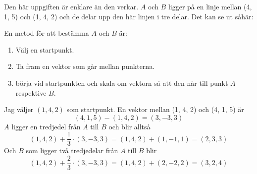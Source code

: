 \documentclass[../main.tex]{subfiles}
\begin{document}
\begin{solution}{4}
Den här uppgiften är enklare än den verkar. $A$ och $B$ ligger på en linje mellan (4, 1, 5) och (1, 4, 2) och de delar upp den här linjen i tre delar. Det kan se ut såhär:

\begin{center}
\end{center}

En metod för att bestämma $A$ och $B$ är:
\begin{enumerate}
    \item Välj en startpunkt.
    \item Ta fram en vektor som går mellan punkterna. 
    \item börja vid startpunkten och skala om vektorn så att den når till punkt $A$ respektive $B$.
\end{enumerate}

Jag väljer $(1, 4, 2)$ som startpunkt. En vektor mellan (1, 4, 2) och (4, 1, 5) är 
\[(4, 1, 5) - (1, 4, 2) = (3, -3, 3)\]
$A$ ligger en tredjedel från $A$ till $B$ och blir alltså
\[(1, 4, 2) + \frac{1}{3}\cdot(3, -3, 3) = (1, 4, 2) + (1, -1, 1) = (2, 3, 3)\]
Och $B$ som ligger två tredjedelar från $A$ till $B$ blir
\[(1, 4, 2) + \frac{2}{3}\cdot(3, -3, 3) = (1, 4, 2) + (2, -2, 2) = (3, 2, 4)\]

\end{solution}
\end{document}
